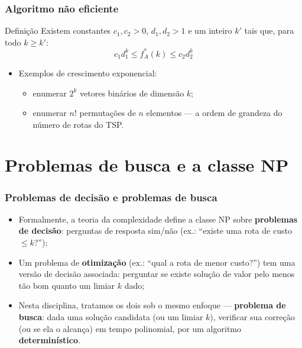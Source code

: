 \documentclass[fleqn]{beamer}
\begin{document}
\begin{frame}
	\frametitle{Algoritmo não eficiente}
	\begin{block}{Definição}
		Existem constantes $c_1, c_2 > 0$, $d_1, d_2 > 1$ e um inteiro
		$k'$ tais que, para todo $k \geq k'$:
		$$
			c_1 d_1^k \leq f_A^*(k) \leq c_2 d_2^k
		$$
	\end{block}
	\begin{itemize}
		\item Exemplos de crescimento exponencial:
		\begin{itemize}
			\item enumerar $2^k$ vetores binários de dimensão $k$;
			\item enumerar $n!$ permutações de $n$ elementos — a ordem de
				grandeza do número de rotas do TSP.
		\end{itemize}
	\end{itemize}
\end{frame}

\section{Problemas de busca e a classe NP}

\begin{frame}
	\frametitle{Problemas de decisão e problemas de busca}
	\begin{itemize}
		\item Formalmente, a teoria da complexidade define a classe NP
			sobre \textbf{problemas de decisão}: perguntas de resposta
			sim/não (ex.: ``existe uma rota de custo $\leq k$?'');
		\item Um problema de \textbf{otimização} (ex.: ``qual a rota de
			menor custo?'') tem uma versão de decisão associada: perguntar
			se existe solução de valor pelo menos tão bom quanto um limiar
			$k$ dado;
		\item Nesta disciplina, tratamos os dois sob o mesmo enfoque —
			\textbf{problema de busca}: dada uma solução candidata (ou um
			limiar $k$), verificar sua correção (ou se ela o alcança) em
			tempo polinomial, por um algoritmo \textbf{determinístico}.
	\end{itemize}
\end{frame}
\end{document}

